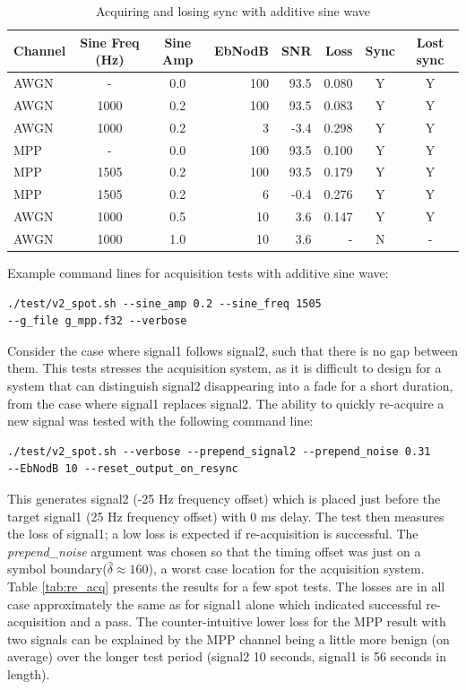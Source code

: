 \documentclass{article}
\begin{document}
\begin{table} [h]
\caption{Acquiring and losing sync with additive sine wave}
\label{tab:acq_with_sine}
\centering
\begin{tabular}{ l | c | c | r | r | r | c | c}
 \hline
 Channel & Sine Freq (\si{Hz}) & Sine Amp & EbNodB & SNR & Loss & Sync & Lost sync \\
 \hline
 AWGN & -    & 0.0 & 100 &  93.5 & 0.080 & Y & Y \\
 AWGN & 1000 & 0.2 & 100 &  93.5 & 0.083 & Y & Y \\
 AWGN & 1000 & 0.2 &   3 &  -3.4 & 0.298 & Y & Y \\
 MPP  & -    & 0.0 & 100 &  93.5 & 0.100 & Y & Y \\
 MPP  & 1505 & 0.2 & 100 &  93.5 & 0.179 & Y & Y \\
 MPP  & 1505 & 0.2 &   6 & -0.4 & 0.276 & Y & Y \\
 AWGN & 1000 & 0.5 &  10 &  3.6 & 0.147 & Y & Y \\
 AWGN & 1000 & 1.0 &  10 &  3.6 & - & N & - \\
 \hline
\end{tabular}
\end{table}

\noindent Example command lines for acquisition tests with additive sine wave:

\begin{verbatim}
./test/v2_spot.sh --sine_amp 0.2 --sine_freq 1505 
--g_file g_mpp.f32 --verbose
\end{verbatim}

\noindent Consider the case where signal1 follows signal2, such that there is no gap between them.  This tests stresses the acquisition system, as it is difficult to design for a system that can distinguish signal2 disappearing into a fade for a short duration, from the case where signal1 replaces signal2. The ability to quickly re-acquire a new signal was tested with the following command line:
\begin{verbatim}
./test/v2_spot.sh --verbose --prepend_signal2 --prepend_noise 0.31 
--EbNodB 10 --reset_output_on_resync
\end{verbatim}

This generates signal2 (-25 \si{Hz} frequency offset) which is placed just before the target signal1 (25 \si{Hz} frequency offset) with 0 \si{ms} delay.  The test then measures the loss of signal1; a low loss is expected if re-acquisition is successful. The \emph{prepend\_noise} argument was chosen so that the timing offset was just on a symbol boundary($\hat{\delta} \approx 160$), a worst case location for the acquisition system. Table \ref{tab:re_acq} presents the results for a few spot tests.  The losses are in all case approximately the same as for signal1 alone which indicated successful re-acquisition and a pass.  The counter-intuitive lower loss for the MPP result with two signals can be explained by the MPP channel being a little more benign (on average) over the longer test period (signal2 10 seconds, signal1 is 56 seconds in length).
\end{document}
